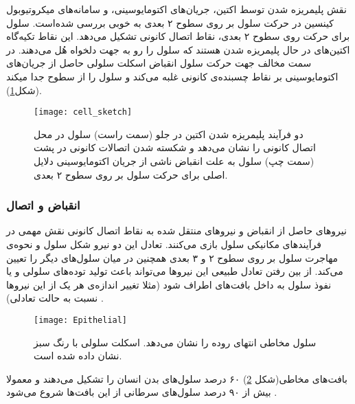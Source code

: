 نقش پلیمریزه شدن توسط اکتین، جریان‌های اکتومایوسینی، و سامانه‌های میکروتیوبول کینسین در حرکت سلول بر روی سطوح ۲ بعدی به خوبی بررسی شده‌است\cite{PhysRevLett.92.078101, refId0, PhysRevE.76.031921}. سلول برای حرکت روی سطوح ۲ بعدی، نقاط اتصال کانونی تشکیل می‌دهد. این نقاط تکیه‌گاه اکتین‌های در حال پلیمریزه شدن هستند که سلول را رو به جهت دلخواه هُل می‌دهند. در سمت مخالف جهت حرکت سلول انقباض اسکلت سلولی حاصل از جریان‌های اکتومایوسینی بر نقاط چسبنده‌ی کانونی غلبه می‌کند و سلول را از سطوح جدا میکند\cite{Hawkins:2011eu} (شکل\ref{fig:migration}).
\begin{figure}[htbp]
\begin{center}
\texttt{[image: cell\_sketch]}
\caption{
دو فرآیند پلیمریزه‌ شدن اکتین در جلو (سمت راست) سلول در محل اتصال کانونی را نشان می‌دهد و شکسته شدن اتصالات کانونی در پشت (سمت چپ) سلول به علت انقباض ناشی از جریان اکتومایوسینی دلایل اصلی برای حرکت سلول بر روی سطوح ۲ بعدی.
}
\label{fig:migration}
\end{center}
\end{figure}


\subsubsection{انقباض و اتصال}\label{lab:traction}
نیروهای حاصل از انقباض و نیروهای منتقل شده به نقاط اتصال کانونی نقش مهمی در فرآیندهای مکانیکی سلول بازی می‌کنند. تعادل این دو نیرو شکل سلول و نحوه‌ی مهاجرت سلول بر روی سطوح ۲ و ۳ بعدی همچنین در میان سلول‌های دیگر را تعیین می‌کند. از بین رفتن تعادل طبیعی این نیروها می‌تواند باعث تولید توده‌های سلولی و یا نفوذ سلول به داخل بافت‌های اطراف شود (مثلا تغییر اندازه‌ی هر یک از این نیروها نسبت به حالت تعادلی)  \cite{doi:10.1080/19336918.2015.1008329}.






\begin{figure}[htbp]
\begin{center}
\texttt{[image: Epithelial]}
\caption{
سلول مخاطی انتهای روده را نشان می‌دهد. اسکلت سلولی با رنگ سبز نشان داده شده است.\cite{10.1371/journal.pone.0030247}
}
\label{fig:Epithelial}
\end{center}
\end{figure}
بافت‌های مخاطی(شکل \ref{fig:Epithelial}) ۶۰ درصد سلول‌های بدن انسان را تشکیل می‌دهند و معمولا بیش از ۹۰ درصد سلول‌های سرطانی از این بافت‌ها شروع می‌شود \cite{doi:10.1080/19336918.2015.1008329}.

